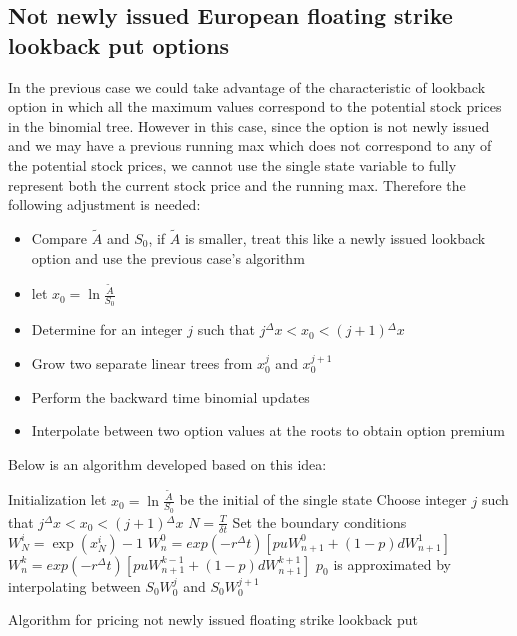 \subsection{Not newly issued European floating strike lookback put options}
In the previous case we could take advantage of the characteristic of lookback option in which all the maximum values correspond to the potential stock prices in the binomial tree. However in this case, since the option is not newly issued and we may have a previous running max which does not correspond to any of the potential stock prices, we cannot use the single state variable to fully represent both the current stock price and the running max. Therefore the following adjustment is needed:
\begin{itemize}
	\item Compare $\tilde{A}$ and $S_{0}$, if $\tilde{A}$ is smaller, treat this like a newly issued lookback option and use the previous case's algorithm
	\item let $x_{0} = \ln \frac{\tilde{A}}{S_{0}}$
	\item Determine for an integer $j$ such that $j{^{\Delta}x} < x_{0} < (j+1){^{\Delta}x}$
	\item Grow two separate linear trees from $x_{0}^{j}$ and $x_{0}^{j+1}$
	\item Perform the backward time binomial updates
	\item Interpolate between two option values at the roots to obtain option premium
\end{itemize}
Below is an algorithm developed based on this idea:\\
\begin{algorithm}[H]
 Initialization\;
 let $x_{0} = \ln \frac{\tilde{A}}{S_{0}}$ be the initial  of the single state\;
 Choose integer $j$ such that $j{^{\Delta}x} < x_{0} < (j+1){^{\Delta}x}$\;
 $N = \frac{T}{\delta t}$\;
 Set the boundary conditions\;
  {
  $W_{N}^{i} = \exp(x_{N}^{i}) - 1$\;
 }
  {
   {
    $W_{n}^{0} = exp(-r{^{\Delta}t})[puW_{n+1}^{0}+(1-p)dW_{n+1}^{1}]$\;
  }
   {
    $W_{n}^{k} = exp(-r{^{\Delta}t})[puW_{n+1}^{k-1}+(1-p)dW_{n+1}^{k+1}]$\;
  }
 }
 $p_{0}$ is approximated by interpolating between $S_{0}W_{0}^{j}$ and $S_{0}W_{0}^{j+1}$\;
\caption{Algorithm for pricing not newly issued floating strike lookback put}
\end{algorithm}
\newpage

